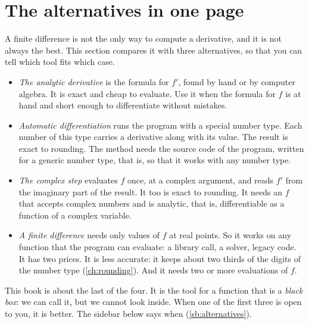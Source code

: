 \begin{figure}
\centering

\end{figure}

\section{The alternatives in one page}\label{sec:why-alternatives}

A finite difference is not the only way to compute a derivative, and it is not always the best. This section
compares it with three alternatives, so that you can tell which tool fits which case.
\begin{itemize}
  \item \emph{The analytic derivative} is the formula for $f'$, found by hand or by computer algebra. It is exact and
    cheap to evaluate. Use it when the formula for $f$ is at hand and short enough to differentiate without
    mistakes.
  \item \emph{Automatic differentiation} runs the program with a special number type. Each number of this type
    carries a derivative along with its value. The result is exact to rounding. The method needs the source code of the program, written for a generic number type, that is, so
    that it works with any number type.
  \item \emph{The complex step} evaluates $f$ once, at a complex argument, and reads $f'$ from the imaginary part of
    the result. It too is exact to rounding. It needs an $f$ that accepts complex numbers and is analytic, that is,
    differentiable as a function of a complex variable.
  \item \emph{A finite difference} needs only values of $f$ at real points. So it works on any function that the
    program can evaluate: a library call, a solver, legacy code. It has two prices. It is less accurate: it keeps
    about two thirds of the digits of the number type (\cref{ch:rounding}). And it needs two or more evaluations of
    $f$.
\end{itemize}
This book is about the last of the four. It is the tool for a function that is a \emph{black box}: we can call it,
but we cannot look inside. When one of the first three is open to you, it is better. The sidebar below says when
(\cref{sb:alternatives}).


